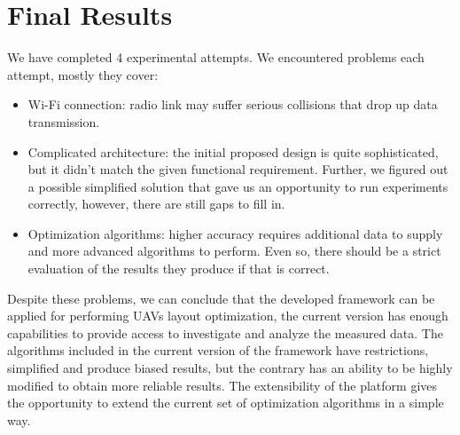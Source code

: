 \hypertarget{final-results}{%
\section{Final Results}\label{final-results}}

We have completed 4 experimental attempts. We encountered problems each
attempt, mostly they cover:

\begin{itemize}
\tightlist
\item
  Wi-Fi connection: radio link may suffer serious collisions that drop
  up data transmission.
\item
  Complicated architecture: the initial proposed design is
  quite sophisticated, but it didn't match the given functional
  requirement. Further, we figured out a possible simplified solution
  that gave us an opportunity to run experiments correctly, however,
  there are still gaps to fill in.
\item
  Optimization algorithms: higher accuracy requires additional data to
  supply and more advanced algorithms to perform. Even so, there should
  be a strict evaluation of the results they produce if that is correct.
\end{itemize}

Despite these problems, we can conclude that the developed framework can
be applied for performing UAVs layout optimization, the current version
has enough capabilities to provide access to investigate and analyze the
measured data. The algorithms included in the current version of the
framework have restrictions, simplified and produce biased results, but
the contrary has an ability to be highly modified to obtain more
reliable results. The extensibility of the platform gives the
opportunity to extend the current set of optimization algorithms in a
simple way.
